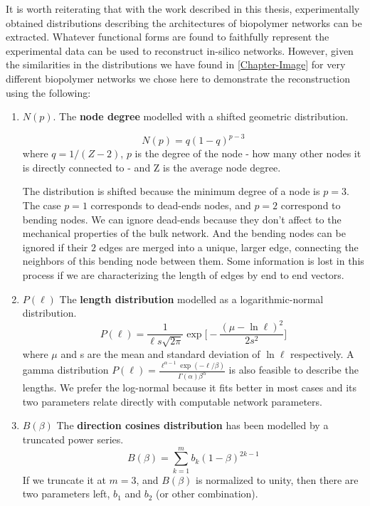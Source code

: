 It is worth reiterating that with the work described in this thesis, experimentally obtained distributions
describing the architectures of biopolymer networks can be extracted. Whatever functional forms are found to
faithfully represent the experimental data can be used to reconstruct in-silico networks. However, given the
similarities in the distributions we have found in \autoref{Chapter-Image} for very different biopolymer networks
we chose here to demonstrate the reconstruction using the following:


\begin{enumerate}
\item \textbf{$N(p)$}. The \textbf{node degree} modelled with a shifted geometric
distribution.

\begin{equation} \label{degree-dist}
N(p)=q(1-q)^{p-3}
\end{equation}
where $q=1/(Z-2)$, $p$ is the degree of the node - how many other nodes it is directly connected to - and Z is the average node degree.

The distribution is shifted because the minimum degree of a node is
$p=3$. The case $p=1$ corresponds to dead-ends nodes, and $p=2$ correspond to
bending nodes. We can ignore dead-ends because they don't affect to the mechanical properties of the bulk network. And the bending nodes
can be ignored if their $2$ edges are merged into a unique, larger edge,
connecting the neighbors of this bending node between them. Some information is lost in this
process if we are characterizing the length of edges by end to end
vectors.

\item \textbf{$P(\ell)$} The \textbf{length distribution} modelled as a
logarithmic-normal distribution.
\begin{equation} \label{length-dist}
P(\ell)=\frac{1}{\ell
s\sqrt{2\pi}}\exp{\bigg[-\frac{(\mu-\ln{\ell})^2}{2s^2}\bigg]}
\end{equation}
where $\mu$ and s are the mean and standard deviation of $\ln{\ell}$
respectively.
A gamma distribution \( P(\ell) = \frac{\ell^{\alpha - 1}\exp(-\ell/\beta)}{\Gamma(\alpha)\beta^\alpha} \) is also feasible to describe the lengths. We prefer the log-normal because it fits better in most cases and its two parameters
relate directly with computable network parameters.

\item \textbf{$B(\beta)$} The \textbf{direction cosines distribution} has been modelled by
  a truncated power series.
\begin{equation} \label{cosines-dist}
B(\beta)=\sum_{k=1}^{m} b_k(1-\beta)^{2k-1}
\end{equation}
If we truncate it at $m=3$, and $B(\beta)$ is normalized to unity, then there
are two parameters left, $b_1$ and $b_2$ (or other combination).
\end{enumerate}

